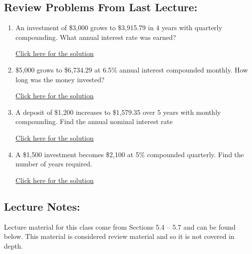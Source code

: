 \documentclass[
]{book}
\providecommand{\tightlist}{%
  \setlength{\itemsep}{0pt}\setlength{\parskip}{0pt}}
\begin{document}
\subsection*{Review Problems From Last Lecture:}\label{review-problems-from-last-lecture-10}

\begin{enumerate}
\def\labelenumi{\arabic{enumi}.}
\tightlist
\item
  An investment of \$3,000 grows to \$3,915.79 in 4 years with quarterly compounding. What annual interest rate was earned?

  \href{https://youtu.be/vQc-7wXZqlk}{Click here for the solution}
\item
  \$5,000 grows to \$6,734.29 at 6.5\% annual interest compounded monthly. How long was the money invested?

  \href{https://youtu.be/M5UPZ7Sv0Hg}{Click here for the solution}
\item
  A deposit of \$1,200 increases to \$1,579.35 over 5 years with monthly compounding. Find the annual nominal interest rate

  \href{https://youtu.be/SNO9GQOu4Bs}{Click here for the solution}
\item
  A \$1,500 investment becomes \$2,100 at 5\% compounded quarterly. Find the number of years required.

  \href{https://youtu.be/sesqd-K7qTM}{Click here for the solution}
\end{enumerate}

\subsection*{Lecture Notes:}\label{lecture-notes-11}

Lecture material for this class come from Sections 5.4 -- 5.7 and can be found below. This material is considered review material and so it is not covered in depth.
\end{document}
